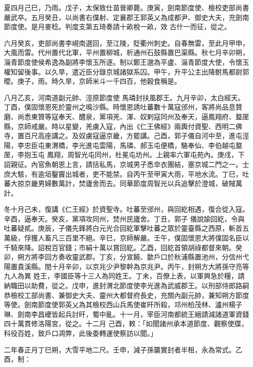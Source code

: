 \begin{pinyinscope}
 夏四月己巳，乃雨。戊子，太保致仕苗晉卿薨。庚寅，劍南節度使、檢校吏部尚書嚴武卒。五月癸丑，以尚書右僕射、定襄郡王郭英乂為成都尹、御史大夫，充劍南節度使。是月麥稔。判度支第五琦奏請十畝稅一畝，效
 古什一而征，從之。



 六月癸亥，吏部尚書李峴南選回，至江陵，貶衢州刺史。自春無雷，至此月甲申，大風而雷。代州置代北軍，平州置柳城，析通州石鼓縣置巴渠縣。秋七月辛卯朔，淄青節度使侯希逸為副將李懷玉所逐。制以鄭王邈為平盧、淄青節度大使，令懷玉權知留後事。以久旱，遣近臣分錄京城諸獄系囚。甲午，升平公主出降駙馬都尉郭曖。庚子，雨。時久旱，京師米斗一千四百，他穀食稱是。



 八月乙亥，河南道副元帥、涇原節度使
 馬璘封扶風郡王。九月辛卯，太白經天。丁酉，僕固懷恩死於靈州之鳴沙縣。時懷恩誘吐蕃數十萬寇邠州，客將尚品息贊磨、尚悉東贊等寇奉天、醴泉，黨項羌、渾、奴剌寇同州及奉天，逼鳳翔府、盩厔縣，京師戒嚴。時以星變，羌虜入寇，內出《仁王佛經》兩輿付資聖、西明二佛寺，置百尺高座講之。及奴虜寇逼京畿，方罷講。己酉，郭子儀自河中至，進屯涇陽，李忠臣屯東渭橋，李光進屯雲陽，馬璘、郝玉屯便橋，駱奉仙、李伯越屯盩厔，李抱玉屯
 鳳翔，周智光屯同州，杜冕屯坊州。上親率六軍屯苑內。庚戌，下詔親征。內官魚朝恩上言，請括私馬，京城男子悉皁衣團結，塞京城二門之一。士庶大駭，有逾垣鑿竇出城者，吏不能禁。自丙午至甲寅大雨，平地水流。丁巳，吐蕃大掠京畿男婦數萬計，焚廬舍而去。同華節度周智光以兵追擊於澄城，破賊萬計。



 冬十月己未，復講《仁王經》於資聖寺。吐蕃至邠州，與回紇相遇，復合從入寇。辛酉，逼奉天。癸亥，黨項攻同州，焚州民廬舍。丁丑，郭子
 儀說諭回紇，令與吐蕃疑貳。庚辰，子儀先鋒將白元光合回紇軍擊吐蕃之眾於靈臺縣之西原，斬首五萬級，俘獲人畜凡三百里不絕。辛巳，京師解嚴。壬午，僕固懷恩大將僕固名臣以千騎來降。詔稅百官錢；市絹十萬以賞回紇。乙酉，回紇首領胡祿都督來朝。癸卯，朔方將李回方奏收靈武郡。丁亥，分宣饒、歙戶口於秋浦縣置池州，分信州弋陽置貴溪縣。閏十月辛卯，以京兆少尹黎幹為京兆尹。丙午，封朔方大將孫守亮等九人為異
 姓王，李國臣等十三人為同姓王。丁未，百僚上表，以軍興急於糧，請納職田以助費，從之。戊申，進封渭北節度使李光進為武威郡王。以刑部侍郎路嗣恭檢校工部尚書、兼御史大夫、靈州大都督府長史，充關內副元帥，兼知朔方節度等使。劍南節度使郭英乂為其檢校西山兵馬使崔旰所殺，邛州柏茂林、瀘州楊子琳、劍南李昌巙皆起兵討旰，蜀中亂。十一月，宰臣河南都統王縉請減諸道軍資錢四十萬貫修洛陽宮，從之。十二月
 己酉，敕：「如聞諸州承本道節度、觀察使牒，科役百姓，致戶口凋弊，此後委轉運使察訪以聞。」



 二年春正月丁巳朔，大雪平地二尺。壬申，減子孫襲實封者半租，永為常式。乙酉，制：




\end{pinyinscope}
